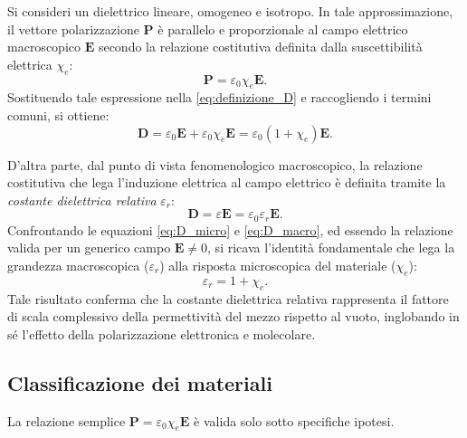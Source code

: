 \documentclass[a4paper,11pt]{report}
\begin{document}
Si consideri un dielettrico lineare, omogeneo e isotropo. In tale approssimazione, il vettore polarizzazione $\bm{P}$ è parallelo e proporzionale al campo elettrico macroscopico $\bm{E}$ secondo la relazione costitutiva definita dalla suscettibilità elettrica $\chi_e$:
\begin{equation}
    \bm{P} = \varepsilon_0 \chi_e \bm{E}.
\end{equation}
Sostituendo tale espressione nella \eqref{eq:definizione_D} e raccogliendo i termini comuni, si ottiene:
\begin{equation}
    \bm{D} = \varepsilon_0 \bm{E} + \varepsilon_0 \chi_e \bm{E} = \varepsilon_0 (1 + \chi_e) \bm{E}.
    \label{eq:D_micro}
\end{equation}

D'altra parte, dal punto di vista fenomenologico macroscopico, la relazione costitutiva che lega l'induzione elettrica al campo elettrico è definita tramite la \textit{costante dielettrica relativa} $\varepsilon_r$:
\begin{equation}
    \bm{D} = \varepsilon \bm{E} = \varepsilon_0 \varepsilon_r \bm{E}.
    \label{eq:D_macro}
\end{equation}
Confrontando le equazioni \eqref{eq:D_micro} e \eqref{eq:D_macro}, ed essendo la relazione valida per un generico campo $\bm{E} \neq 0$, si ricava l'identità fondamentale che lega la grandezza macroscopica ($\varepsilon_r$) alla risposta microscopica del materiale ($\chi_e$):
\begin{equation}
    \varepsilon_r = 1 + \chi_e.
\end{equation}
Tale risultato conferma che la costante dielettrica relativa rappresenta il fattore di scala complessivo della permettività del mezzo rispetto al vuoto, inglobando in sé l'effetto della polarizzazione elettronica e molecolare.

\subsection{Classificazione dei materiali}
La relazione semplice $\bm{P} = \varepsilon_0 \chi_e \bm{E}$ è valida solo sotto specifiche ipotesi. 
\end{document}
